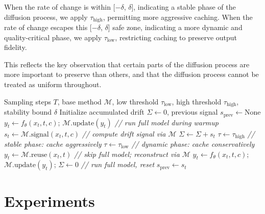 \documentclass{article}
\begin{document}
When the rate of change is within [$-\delta$, $\delta$], indicating a stable phase of the diffusion process, we apply $\tau_{\text{high}}$, permitting more aggressive caching. When the rate of change escapes this [$-\delta$, $\delta$] safe zone, indicating a more dynamic and quality-critical phase, we apply $\tau_{\text{low}}$, restricting caching to preserve output fidelity. 

This reflects the key observation that certain parts of the diffusion process are more important to preserve than others, and that the diffusion process cannot be treated as uniform throughout.

\begin{algorithm}[t]
\caption{Adaptive Threshold Caching}
\label{alg:adaptive_threshold}
\begin{algorithmic}[1]
\Require Sampling steps $T$, base method $\mathcal{M}$, low threshold $\tau_{\text{low}}$, high threshold $\tau_{\text{high}}$, stability bound $\delta$
\State Initialize accumulated drift $\Sigma \leftarrow 0$, previous signal $s_{\text{prev}} \leftarrow \text{None}$
        \State $y_t \leftarrow f_\theta(x_t, t, c)$; \; $\mathcal{M}.\text{update}(y_t)$ \hfill \textit{// run full model during warmup}
    \Else
        \State $s_t \leftarrow \mathcal{M}.\text{signal}(x_t, t, c)$ \hfill \textit{// compute drift signal via $\mathcal{M}$}
        \State $\Sigma \leftarrow \Sigma + s_t$
            \State $\tau \leftarrow \tau_{\text{high}}$ \hfill \textit{// stable phase: cache aggressively}
        \Else
            \State $\tau \leftarrow \tau_{\text{low}}$ \hfill \textit{// dynamic phase: cache conservatively}
        \EndIf
        \If{$\Sigma \leq \tau$}
            \State $y_t \leftarrow \mathcal{M}.\text{reuse}(x_t, t)$ \hfill \textit{// skip full model; reconstruct via $\mathcal{M}$}
        \Else
            \State $y_t \leftarrow f_\theta(x_t, t, c)$; \; $\mathcal{M}.\text{update}(y_t)$; \; $\Sigma \leftarrow 0$ \hfill \textit{// run full model, reset}
        \EndIf
        \State $s_{\text{prev}} \leftarrow s_t$
    \EndIf
\EndFor
\end{algorithmic}
\end{algorithm}





\section{Experiments}
\end{document}
